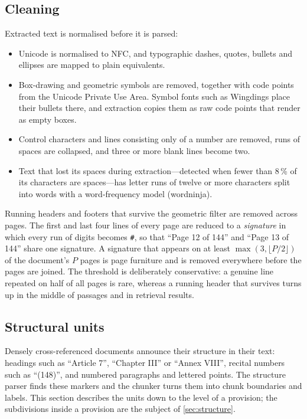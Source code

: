 \subsection{Cleaning}

Extracted text is normalised before it is parsed:

\begin{itemize}
  \item Unicode is normalised to NFC, and typographic dashes, quotes, bullets
  and ellipses are mapped to plain equivalents.
  \item Box-drawing and geometric symbols are removed, together with code
  points from the Unicode Private Use Area. Symbol fonts such as Wingdings
  place their bullets there, and extraction copies them as raw code points
  that render as empty boxes.
  \item Control characters and lines consisting only of a number are removed,
  runs of spaces are collapsed, and three or more blank lines become two.
  \item Text that lost its spaces during extraction---detected when fewer
  than 8\,\% of its characters are spaces---has letter runs of twelve or more
  characters split into words with a word-frequency model (wordninja).
\end{itemize}

Running headers and footers that survive the geometric filter are removed
across pages. The first and last four lines of every page are reduced to a
\emph{signature} in which every run of digits becomes \texttt{\#}, so that
``Page 12 of 144'' and ``Page 13 of 144'' share one signature. A signature
that appears on at least $\max(3, \lfloor P/2 \rfloor)$ of the document's
$P$ pages is page furniture and is removed everywhere before the pages are
joined. The threshold is deliberately conservative: a genuine line repeated
on half of all pages is rare, whereas a running header that survives turns up
in the middle of passages and in retrieval results.

\subsection{Structural units}

Densely cross-referenced documents announce their structure in their text:
headings such as ``Article 7'', ``Chapter III'' or ``Annex VIII'', recital
numbers such as ``(148)'', and numbered paragraphs and lettered points. The
structure parser finds these markers and the chunker turns them into chunk
boundaries and labels. This section describes the units down to the level of
a provision; the subdivisions inside a provision are the subject of
\cref{sec:structure}.

